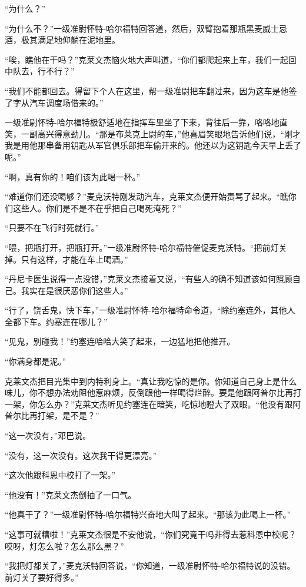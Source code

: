     “为什么？”

    “为什么不？”一级准尉怀特-哈尔福特回答道，然后，双臂抱着那瓶黑麦威士忌酒，极其满足地仰躺在泥地里。

    “唉，瞧他在干吗？”克莱文杰恼火地大声叫道，“你们都爬起来上车，我们一起回中队去，行不行？”

    “我们不能都回去。得留下个人在这里，帮一级准尉把车翻过来，因为这车是他签了字从汽车调度场借来的。”

    一级准尉怀特-哈尔福特极舒适地在指挥车里坐了下来，背往后一靠，咯咯地直笑，一副高兴得意劲儿。“那是布莱克上尉的车，”他喜眉笑眼地告诉他们说，“刚才我是用他那串备用钥匙从军官俱乐部把车偷开来的。他还以为这钥匙今天早上丢了呢。”

    “啊，真有你的！咱们该为此喝一杯。”

    “难道你们还没喝够？”麦克沃特刚发动汽车，克莱文杰便开始责骂了起来。“瞧你们这些人。你们是不是不在乎把自己喝死淹死？”

    “只要不在飞行时死就行。”

    “喂，把瓶打开，把瓶打开。”一级准尉怀特-哈尔福特催促麦克沃特。“把前灯关掉。只有这样，才能在车上喝酒。”

    “丹尼卡医生说得一点没错，”克莱文杰接着又说，“有些人的确不知道该如何照顾自己。我实在是很厌恶你们这些人。”
 


    “行了，饶舌鬼，快下车，”一级准尉怀特-哈尔福特命令道，“除约塞连外，其他人全都下车。约塞连在哪儿？”

    “见鬼，别碰我！”约塞连哈哈大笑了起来，一边猛地把他推开。

    “你满身都是泥。”

    克莱文杰把目光集中到内特利身上。“真让我吃惊的是你。你知道自己身上是什么味儿，你不想办法劝阻他惹麻烦，反倒跟他一样喝得烂醉。要是他跟阿普尔比再打一架，你怎么办？”克莱文杰听见约塞连在暗笑，吃惊地瞪大了双眼。“他没有跟阿普尔比再打架，是不是？”

    “这一次没有，”邓巴说。

    “没有，这一次没有。这次我干得更漂亮。”

    “这次他跟科恩中校打了一架。”

    “他没有！”克莱文杰倒抽了一口气。

    “他真干了？”一级准尉怀特-哈尔福特兴奋地大叫了起来。“那该为此喝上一杯。”

    “这事可就糟啦！”克莱文杰很是不安他说，“你们究竟干吗非得去惹科恩中校呢？哎呀，灯怎么啦？怎么那么黑？”

    “我把灯都关了，”麦克沃特回答说，“你知道，一级准尉怀特-哈尔福特说的没错。前灯关了要好得多。”

